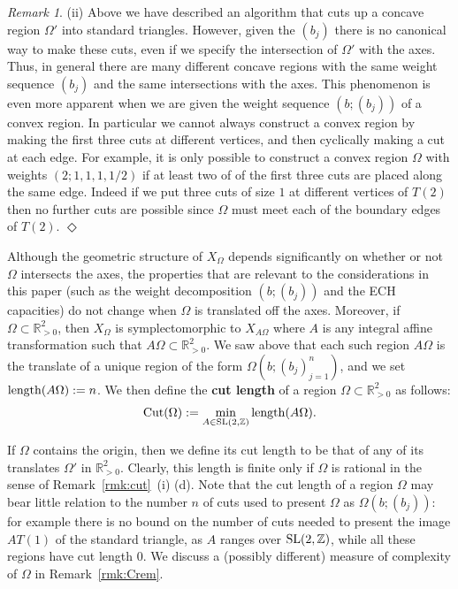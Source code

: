 \documentclass[11pt, reqno]{amsart}
\theoremstyle{remark}
\numberwithin{equation}{subsection}
\numberwithin{figure}{section}
\theoremstyle{customremark}
\newtheorem{rmk_no_diamond}[thm]{Remark}
\newenvironment{rmk}{\begin{rmk_no_diamond} } {\hfill$\er$ \end{rmk_no_diamond}}
\newcommand{\SL}{{\rm SL}}
\newcommand{\NI}{{\noindent}}
\newcommand{\Om}{{\Omega}}
\newcommand{\er}{{\Diamond}}
\newcommand{\Z}{\mathbb{Z}}
\newcommand{\R}{\mathbb{R}}
\begin{document}
\begin{rmk}
   \NI (ii)
 Above we have described an algorithm that cuts up a concave region $\Om'$  into standard triangles. However, given the $(b_j)$ 
  there is no canonical way to make these cuts,
 even if  we specify the intersection of $\Om'$ with the axes. 
 Thus, in general there are   many different concave regions with the same weight sequence $(b_j)$ and the same intersections with the axes.  This phenomenon is even more  apparent when we are given the weight sequence $(b; (b_j))$ of a convex region. 
 In particular we cannot always  construct a convex region by making the first  three cuts at different vertices, and then cyclically  making a cut at each edge.  For example, it is only possible to construct a convex region $\Om$ with weights $(2;1,1,1,1/2)$ if at least two of
  of the first three cuts are placed along the same edge. Indeed if we put three cuts of size $1$ at different vertices of $T(2)$ then no further cuts are possible since  $\Om$  must meet each of the boundary edges of $T(2)$.
\end{rmk}


Although the geometric structure of $X_\Om$ depends significantly on whether or not $\Om$ intersects the axes, the properties that are relevant to the considerations in this paper (such as the weight decomposition $(b; (b_j))$ and the ECH capacities) do not change when $\Om$ is translated off the axes. Moreover, if $\Om\subset \R^2_{>0}$, then $X_\Om$ is symplectomorphic to $X_{A\Om}$ where $A$ is any integral affine transformation such that $A\Om\subset \R^2_{>0}$.  We saw above that each such region $A\Om$ is the translate of a unique region of the form  $\Om(b; (b_j)_{j=1}^n)$, and we set ${\rm length}(A\Om): = n$. 
We  then define the {\bf cut length} of a region $\Om\subset \R^2_{>0}$
as follows:
\begin{align}\label{eq:cutdefn}
{\rm Cut}(\Om): = \min_{A\in \SL(2,\Z)}  {\rm length}(A\Om). %
\end{align}

If $\Om$ contains the origin, then we define its cut length to be that of any of its translates $\Om'$ in $\R^2_{>0}$.
Clearly, this length is finite only if $\Om$ is rational in the sense of Remark~\ref{rmk:cut}~(i) (d). Note that the cut length of a region $\Om$ may bear little relation to the number $n$ of cuts used to present  $\Om$  as $\Om(b;(b_j))$: for example there is no bound on the number of cuts needed to present the image $AT(1)$ of the standard triangle, as $A$ ranges over $\SL(2,\Z)$, while all these regions have cut length $0$.  We discuss a (possibly different) measure of complexity of $\Om$ in Remark~\ref{rmk:Crem}.
\end{document}
